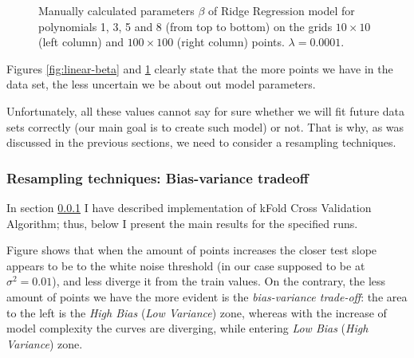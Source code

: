 \begin{figure}[!ht]
\begin{subfigure}{\textwidth}
\end{subfigure}
\caption{Manually calculated parameters $\beta$ of Ridge Regression model for polynomials 1, 3, 5 and 8 (from top to bottom) on the grids $10\times10$ (left column) and $100\times100$ (right column) points. $\lambda = 0.0001$.}
\label{fig:ridge-beta}
\end{figure}

Figures \ref{fig:linear-beta} and \ref{fig:ridge-beta} clearly state that the more points we have in the data set, the less uncertain we be about out model parameters.


Unfortunately, all these values cannot say for sure whether we will fit future data sets correctly (our main goal is to create such model) or not. That is why, as was discussed in the previous sections, we need to consider a resampling techniques. 

 \subsubsection{Resampling techniques: Bias-variance tradeoff}
 
 In section \ref{} I have described implementation of kFold Cross Validation Algorithm; thus, below I present the main results for the specified runs.
 
 Figure \rf{} shows that when the amount of points increases the closer test slope appears to be to the white noise threshold (in our case supposed to be at $\sigma^2=0.01$), and less diverge it from the train values. On the contrary, the less amount of points we have the more evident is the \textit{bias-variance trade-off}: the area to the left is the \textit{High Bias} (\textit{Low Variance}) zone, whereas with the increase of model complexity the curves are diverging, while entering \textit{Low Bias} (\textit{High Variance}) zone.
 
